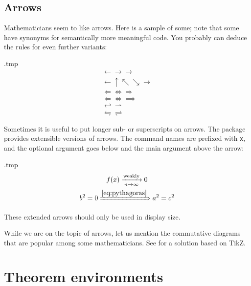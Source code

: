 %
%
\subsection{Arrows}
Mathematicians seem to like arrows.
Here is a sample of some;
note that some have synonyms for semantically more meaningful code.
You probably can deduce the rules for even further variants:
\begin{VerbatimOut}{\jobname.tmp}
\begin{gather*}
\gets \to \mapsto\\
\leftarrow \uparrow \nwarrow \searrow \rightarrow\\
\Leftarrow \Leftrightarrow \Rightarrow\\
\Longleftarrow \Longleftrightarrow \implies\\
\hookleftarrow \rightharpoonup\\
\leftrightharpoons \rightleftharpoons
\end{gather*}
\end{VerbatimOut}
\ShowExample

Sometimes it is useful to put longer sub- or superscripts on arrows.
The  package provides extensible versions of arrows.
The command names are prefixed with \verb|x|,
and the optional argument goes below and the main argument above the arrow:
%
\begin{VerbatimOut}{\jobname.tmp}
\begin{gather*}
f(x) \xrightarrow[n \to \infty]{\text{weakly}} 0\\
b^2 = 0
\xRightarrow{\eqref{eq:pythagoras}} a^2 = c^2
\end{gather*}
\end{VerbatimOut}
\ShowExample

\begin{gotcha}
These extended arrows should only be used in display size.
\end{gotcha}

While we are on the topic of arrows,
let us mention the commutative diagrams that are popular among some mathematicians.
See  for a solution based on TikZ.



%
%
%
\section{Theorem environments}

